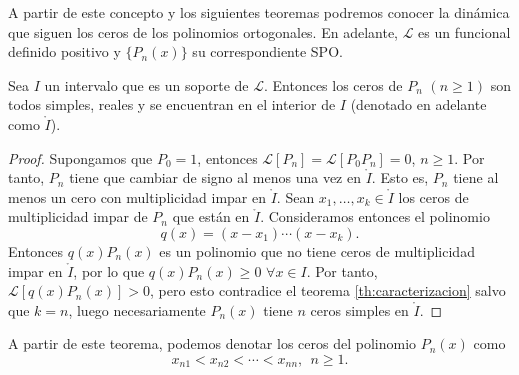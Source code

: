 A partir de este concepto y los siguientes teoremas podremos conocer la dinámica que siguen los ceros de los polinomios ortogonales. En adelante, $\mathcal{L}$ es un funcional definido positivo y $\{P_n(x)\}$ su correspondiente SPO.

\begin{teorema}
    Sea $I$ un intervalo que es un soporte de $\mathcal{L}$. Entonces los ceros de $P_n$ $(n\geq 1)$ son todos simples, reales y se encuentran en el interior de $I$ (denotado en adelante como $\mathring{I}$).
\end{teorema}
\begin{proof}
    Supongamos que $P_0 = 1$, entonces $\mathcal{L}[P_n] = \mathcal{L}[P_0 P_n] = 0$, $n\geq 1$. Por tanto, $P_n$ tiene que cambiar de signo al menos una vez en $\mathring I$. Esto es, $P_n$ tiene al menos un cero con multiplicidad impar en $\mathring I$. Sean $x_1, \dots, x_k\in \mathring I$ los ceros de multiplicidad impar de $P_n$ que están en $\mathring{I}$. Consideramos entonces el polinomio 
    $$
    q(x) = (x-x_1)\cdots(x-x_k).
    $$
    Entonces $q(x)P_n(x)$ es un polinomio que no tiene ceros de multiplicidad impar en $\mathring{I}$, por lo que $q(x)P_n(x)\geq 0$ $\forall x\in I$. Por tanto, $\mathcal L[q(x)P_n(x)]>0$, pero esto contradice el teorema \ref{th:caracterizacion} salvo que $k=n$, luego necesariamente $P_n(x)$ tiene $n$ ceros simples en $\mathring I$.
\end{proof}

A partir de este teorema, podemos denotar los ceros del polinomio $P_n(x)$ como
$$
x_{n1} < x_{n2} < \cdots < x_{nn}, \ \ n\geq 1.
$$

